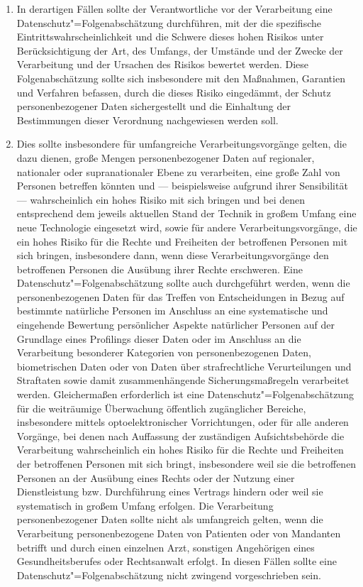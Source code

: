 \begin{enumerate}

   \item In derartigen Fällen sollte der Verantwortliche vor der Verarbeitung eine Datenschutz"=Folgenabschätzung
    durchführen, mit der die spezifische Eintrittswahrscheinlichkeit und die Schwere dieses hohen Risikos unter
    Berücksichtigung der Art, des Umfangs, der Umstände und der Zwecke der Verarbeitung und der Ursachen des Risikos
    bewertet werden. Diese Folgenabschätzung sollte sich insbesondere mit den Maßnahmen, Garantien und Verfahren
    befassen, durch die dieses Risiko eingedämmt, der Schutz personenbezogener Daten sichergestellt und die Einhaltung
    der Bestimmungen dieser Verordnung nachgewiesen werden soll.%
   \label{eg:90}
   

   \item Dies sollte insbesondere für umfangreiche Verarbeitungsvorgänge gelten, die dazu dienen, große Mengen
    personenbezogener Daten auf regionaler, nationaler oder supranationaler Ebene zu verarbeiten, eine große Zahl von
    Personen betreffen könnten und — beispielsweise aufgrund ihrer Sensibilität — wahrscheinlich ein hohes Risiko mit
    sich bringen und bei denen entsprechend dem jeweils aktuellen Stand der Technik in großem Umfang eine neue
    Technologie eingesetzt wird, sowie für andere Verarbeitungsvorgänge, die ein hohes Risiko für die Rechte und
    Freiheiten der betroffenen Personen mit sich bringen, insbesondere dann, wenn diese Verarbeitungsvorgänge den
    betroffenen Personen die Ausübung ihrer Rechte erschweren. Eine Datenschutz"=Folgenabschätzung sollte auch
    durchgeführt werden, wenn die personenbezogenen Daten für das Treffen von Entscheidungen in Bezug auf bestimmte
    natürliche Personen im Anschluss an eine systematische und eingehende Bewertung persönlicher Aspekte natürlicher
    Personen auf der Grundlage eines Profilings dieser Daten oder im Anschluss an die Verarbeitung besonderer
    Kategorien von personenbezogenen Daten, biometrischen Daten oder von Daten über strafrechtliche Verurteilungen und
    Straftaten sowie damit zusammenhängende Sicherungsmaßregeln verarbeitet werden. Gleichermaßen erforderlich ist eine
    Datenschutz"=Folgenabschätzung für die weiträumige Überwachung öffentlich zugänglicher Bereiche, insbesondere
    mittels optoelektronischer Vorrichtungen, oder für alle anderen Vorgänge, bei denen nach Auffassung der zuständigen
    Aufsichtsbehörde die Verarbeitung wahrscheinlich ein hohes Risiko für die Rechte und Freiheiten der betroffenen
    Personen mit sich bringt, insbesondere weil sie die betroffenen Personen an der Ausübung eines Rechts oder der
    Nutzung einer Dienstleistung bzw. Durchführung eines Vertrags hindern oder weil sie systematisch in großem Umfang
    erfolgen. Die Verarbeitung personenbezogener Daten sollte nicht als umfangreich gelten, wenn die Verarbeitung
    personenbezogene Daten von Patienten oder von Mandanten betrifft und durch einen einzelnen Arzt, sonstigen
    Angehörigen eines Gesundheitsberufes oder Rechtsanwalt erfolgt. In diesen Fällen sollte eine
    Datenschutz"=Folgenabschätzung nicht zwingend vorgeschrieben sein.%
   \label{eg:91}
   

\end{enumerate}
